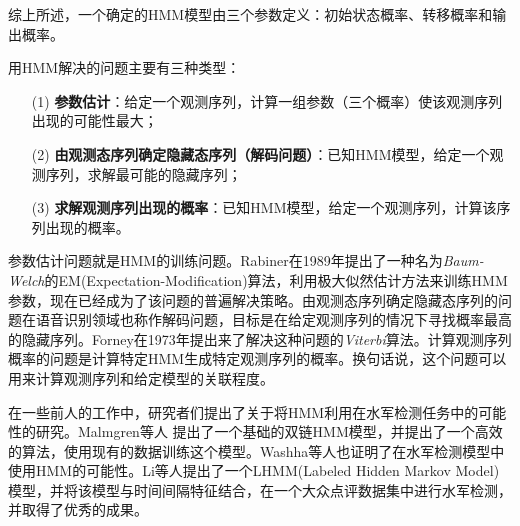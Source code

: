 综上所述，一个确定的HMM模型由三个参数定义：初始状态概率、转移概率和输出概率。

用HMM解决的问题主要有三种类型：

\begin{enumerate}		
	\item[(1)] \textbf{参数估计}：给定一个观测序列，计算一组参数（三个概率）使该观测序列出现的可能性最大；
	\item[(2)] \textbf{由观测态序列确定隐藏态序列（解码问题）}：已知HMM模型，给定一个观测序列，求解最可能的隐藏序列；
	\item[(3)] \textbf{求解观测序列出现的概率}：已知HMM模型，给定一个观测序列，计算该序列出现的概率。
\end{enumerate}

参数估计问题就是HMM的训练问题。Rabiner在1989年提出了一种名为\emph{Baum-Welch}\cite{Rabiner:1989}的EM(Expectation-Modification)算法，利用极大似然估计方法来训练HMM参数，现在已经成为了该问题的普遍解决策略。由观测态序列确定隐藏态序列的问题在语音识别领域也称作解码问题，目标是在给定观测序列的情况下寻找概率最高的隐藏序列。Forney在1973年提出来了解决这种问题的\emph{Viterbi}\cite{Forney:1973}算法。计算观测序列概率的问题是计算特定HMM生成特定观测序列的概率。换句话说，这个问题可以用来计算观测序列和给定模型的关联程度。


在一些前人的工作中，研究者们提出了关于将HMM利用在水军检测任务中的可能性的研究。Malmgren等人 \parencite{Malmgren:2009}提出了一个基础的双链HMM模型，并提出了一个高效的算法，使用现有的数据训练这个模型。Washha等人\parencite{WASHHA:2017}也证明了在水军检测模型中使用HMM的可能性。Li等人\parencite{Li:2017}提出了一个LHMM(Labeled Hidden Markov Model)模型，并将该模型与时间间隔特征结合，在一个大众点评数据集中进行水军检测，并取得了优秀的成果。


